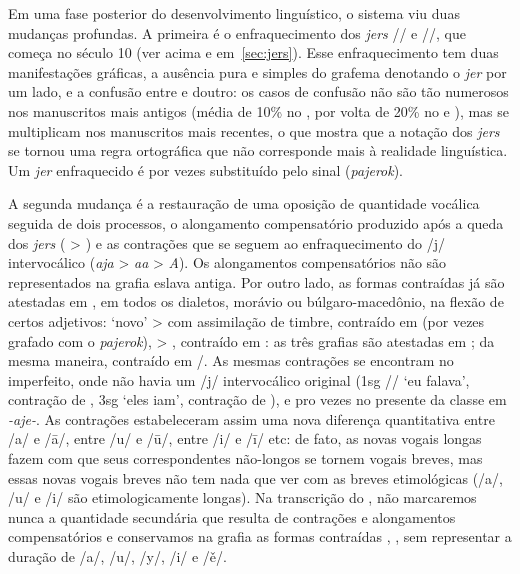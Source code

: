 Em uma fase posterior do desenvolvimento linguístico, o sistema viu duas
mudanças profundas.
A primeira é o enfraquecimento dos \emph{jers} /\jeri{}/ e /\jeru{}/,
que começa no século 10 (ver acima e em~\ref{sec:jers}).
Esse enfraquecimento tem duas manifestações gráficas, a ausência pura e simples
do grafema denotando o \emph{jer} por um lado, e a confusão entre
 e  doutro: os casos de confusão não
são tão numerosos nos manuscritos mais antigos (média de 10\% no
, por volta de 20\% no  e
), mas se multiplicam nos manuscritos mais recentes, o que
mostra que a notação dos \emph{jers} se tornou uma regra ortográfica que não
corresponde mais à realidade linguística.
Um \emph{jer} enfraquecido é por vezes substituído pelo sinal 
(\emph{pajerok}).

A segunda mudança é a restauração de uma oposição de quantidade vocálica seguida
de dois processos, o alongamento compensatório produzido após a queda dos
\emph{jers} ( > ) e as contrações que se seguem ao
enfraquecimento do /j/ intervocálico (\emph{aja} > \emph{aa} > \emph{A}).
Os alongamentos compensatórios não são representados na grafia eslava antiga.
Por outro lado, as formas contraídas já são atestadas em , em todos
os dialetos, morávio ou búlgaro-macedônio, na flexão de certos adjetivos:
  `novo' >
 com assimilação de timbre, contraído em
 (por vezes grafado
 com o \emph{pajerok}),
  >
, contraído em
: as três grafias são atestadas em ; da mesma maneira,  contraído
em \slash{}.
As mesmas contrações se encontram no imperfeito, onde não havia um /j/
intervocálico original (1sg /\slash{} `eu
falava', contração de , 3sg
 `eles iam', contração de
), e pro vezes no presente da classe em
\emph{-aje-}.
As contrações estabeleceram assim uma nova diferença quantitativa entre /a/ e
/ā/, entre /u/ e /ū/, entre /i/ e /ī/ etc: de fato, as novas vogais longas fazem
com que seus correspondentes não-longos se tornem vogais breves, mas essas novas
vogais breves não tem nada que ver com as breves etimológicas (/a/, /u/ e /i/
são etimologicamente longas).
Na transcrição do , não marcaremos nunca a quantidade secundária
que resulta de contrações e alongamentos compensatórios e conservamos na grafia
as formas contraídas  ,
 , 
 sem representar a duração de /a/, /u/,
/y/, /i/ e /ě/.

